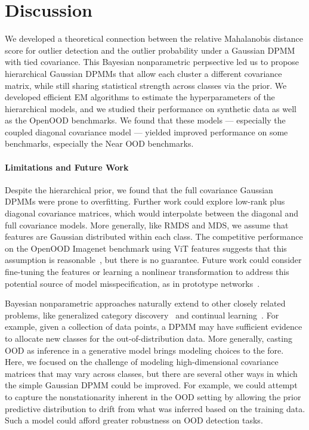 \section{Discussion}
We developed a theoretical connection between the relative Mahalanobis distance score for outlier detection and the outlier probability under a Gaussian DPMM with tied covariance.
This Bayesian nonparametric perpsective led us to propose hierarchical Gaussian DPMMs that allow each cluster a different covariance matrix, while still sharing statistical strength across classes via the prior.
We developed efficient EM algorithms to estimate the hyperparameters of the hierarchical models, and we studied their performance on synthetic data as well as the OpenOOD benchmarks.
We found that these models --- especially the coupled diagonal covariance model --- yielded improved performance on some benchmarks, especially the Near OOD benchmarks.

\paragraph{Limitations and Future Work}
Despite the hierarchical prior, we found that the full covariance Gaussian DPMMs were prone to overfitting.
Further work could explore low-rank plus diagonal covariance matrices, which would interpolate between the diagonal and full covariance models.
More generally, like RMDS and MDS, we assume that features are Gaussian distributed within each class.
The competitive performance on the OpenOOD Imagenet benchmark using ViT features suggests that this assumption is reasonable~\citep{yang2022openood,zhang23openood15}, but there is no guarantee.
Future work could consider fine-tuning the features or learning a nonlinear transformation to address this potential source of model misspecification, as in prototype networks~\citep{snell2017prototypical}.


Bayesian nonparametric approaches naturally extend to other closely related problems, like generalized category discovery~\cite{vaze22} and continual learning~\cite{van2022three}.
For example,
given a collection of data points, a DPMM may have sufficient evidence to allocate new classes for the out-of-distribution data.
More generally, casting OOD as inference in a generative model brings modeling choices to the fore.
Here, we focused on the challenge of modeling high-dimensional covariance matrices that may vary across classes, but there are several other ways in which the simple Gaussian DPMM could be improved.
For example, we could attempt to capture the nonstationarity inherent in the OOD setting by allowing the prior predictive distribution to drift from what was inferred based on the training data.
Such a model could afford greater robustness on OOD detection tasks.

